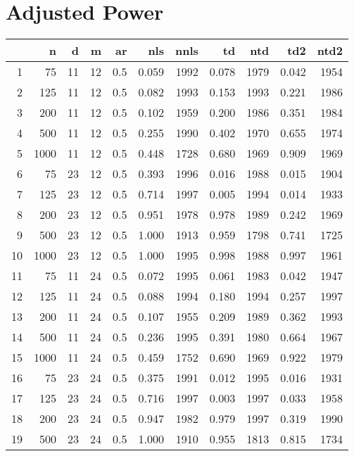 \documentclass{article}
\begin{document}
\section{Adjusted Power}
\begin{tabular}{rrrrrrrrrrr}
  \hline
 & n & d & m & ar & nls & nnls & td & ntd & td2 & ntd2 \\ 
  \hline
1 & 75 & 11 & 12 & 0.5 & 0.059 & 1992 & 0.078 & 1979 & 0.042 & 1954 \\ 
  2 & 125 & 11 & 12 & 0.5 & 0.082 & 1993 & 0.153 & 1993 & 0.221 & 1986 \\ 
  3 & 200 & 11 & 12 & 0.5 & 0.102 & 1959 & 0.200 & 1986 & 0.351 & 1984 \\ 
  4 & 500 & 11 & 12 & 0.5 & 0.255 & 1990 & 0.402 & 1970 & 0.655 & 1974 \\ 
  5 & 1000 & 11 & 12 & 0.5 & 0.448 & 1728 & 0.680 & 1969 & 0.909 & 1969 \\ 
   \hline
6 & 75 & 23 & 12 & 0.5 & 0.393 & 1996 & 0.016 & 1988 & 0.015 & 1904 \\ 
  7 & 125 & 23 & 12 & 0.5 & 0.714 & 1997 & 0.005 & 1994 & 0.014 & 1933 \\ 
  8 & 200 & 23 & 12 & 0.5 & 0.951 & 1978 & 0.978 & 1989 & 0.242 & 1969 \\ 
  9 & 500 & 23 & 12 & 0.5 & 1.000 & 1913 & 0.959 & 1798 & 0.741 & 1725 \\ 
  10 & 1000 & 23 & 12 & 0.5 & 1.000 & 1995 & 0.998 & 1988 & 0.997 & 1961 \\ 
   \hline
11 & 75 & 11 & 24 & 0.5 & 0.072 & 1995 & 0.061 & 1983 & 0.042 & 1947 \\ 
  12 & 125 & 11 & 24 & 0.5 & 0.088 & 1994 & 0.180 & 1994 & 0.257 & 1997 \\ 
  13 & 200 & 11 & 24 & 0.5 & 0.107 & 1955 & 0.209 & 1989 & 0.362 & 1993 \\ 
  14 & 500 & 11 & 24 & 0.5 & 0.236 & 1995 & 0.391 & 1980 & 0.664 & 1967 \\ 
  15 & 1000 & 11 & 24 & 0.5 & 0.459 & 1752 & 0.690 & 1969 & 0.922 & 1979 \\ 
   \hline
16 & 75 & 23 & 24 & 0.5 & 0.375 & 1991 & 0.012 & 1995 & 0.016 & 1931 \\ 
  17 & 125 & 23 & 24 & 0.5 & 0.716 & 1997 & 0.003 & 1997 & 0.033 & 1958 \\ 
  18 & 200 & 23 & 24 & 0.5 & 0.947 & 1982 & 0.979 & 1997 & 0.319 & 1990 \\ 
  19 & 500 & 23 & 24 & 0.5 & 1.000 & 1910 & 0.955 & 1813 & 0.815 & 1734 \\ 

\end{tabular}
\end{document}
